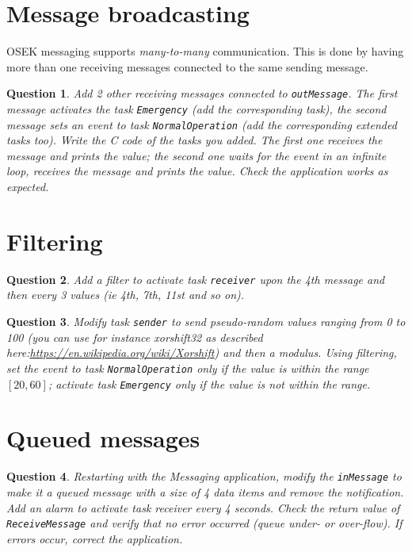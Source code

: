 \documentclass[11pt]{report}
\newtheorem{ex}{Question}
\begin{document}
\section{Message broadcasting}

OSEK messaging supports \emph{many-to-many} communication. This is done by having more than one receiving messages connected to the same sending message.
\begin{ex}
Add 2 other receiving messages connected to \texttt{outMessage}. The first message activates the task \texttt{Emergency} (add the corresponding task), the second message sets an event to task \texttt{NormalOperation} (add the corresponding extended tasks too). Write the C code of the tasks you added. The first one receives the message and prints the value; the second one waits for the event in an infinite loop, receives the message and prints the value. Check the application works as expected.
\end{ex}

\section{Filtering}

\begin{ex}
Add a filter to activate task \texttt{receiver} upon the 4th message and then every 3 values (ie 4th, 7th, 11st and so on).
\end{ex}

\begin{ex}
    Modify task \texttt{sender} to send  pseudo-random values ranging from 0 to 100 (you can use for instance xorshift32 as described here:\url{https://en.wikipedia.org/wiki/Xorshift}) and then a modulus.
    Using filtering, set the event to task \texttt{NormalOperation} only if the value is within the range $[20,60]$; activate task \texttt{Emergency} only if the value is not within the range.
\end{ex}

\section{Queued messages}


\begin{ex}
    Restarting with the Messaging application, modify the \texttt{inMessage} to make it a queued message with a size of 4 data items and remove the notification. Add an alarm to activate task receiver every 4 seconds. Check the return value of \texttt{ReceiveMessage} and verify that no error occurred (queue under- or over-flow). If errors occur, correct the application.
\end{ex}
\end{document}
